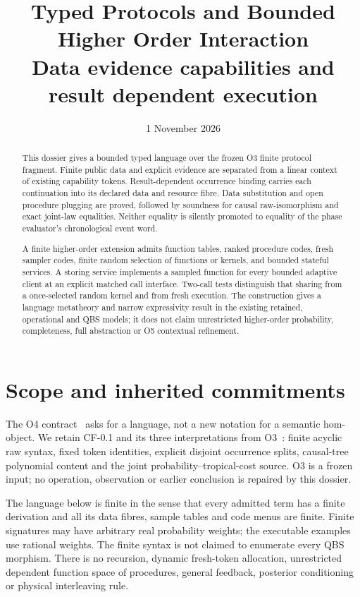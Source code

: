 \documentclass[11pt,a4paper]{article}
\title{Typed Protocols and Bounded Higher Order Interaction\\[5pt]
\large Data evidence capabilities and result dependent execution}
\author{}
\date{1 November 2026}
\theoremstyle{definition}
\begin{document}
\maketitle

\begin{abstract}
This dossier gives a bounded typed language over the frozen O3 finite
protocol fragment. Finite public data and explicit evidence are separated
from a linear context of existing capability tokens. Result-dependent
occurrence binding carries each continuation into its declared data and
resource fibre. Data substitution and open procedure plugging are proved,
followed by soundness for causal raw-isomorphism and exact joint-law
equalities. Neither equality is silently promoted to equality of the
phase evaluator's chronological event word.

A finite higher-order extension admits function tables, ranked procedure
codes, fresh sampler codes, finite random selection of functions or kernels,
and bounded stateful services. A storing service implements a sampled
function for every bounded adaptive client at an explicit matched call
interface. Two-call tests distinguish that sharing from a once-selected
random kernel and from fresh execution. The construction gives a language
metatheory and narrow expressivity result in the existing retained,
operational and QBS models; it does not claim unrestricted higher-order
probability, completeness, full abstraction or O5 contextual refinement.
\end{abstract}

\tableofcontents

\section{Scope and inherited commitments}\label{sec:scope}
The O4 contract~\cite{Contract} asks for a language, not a new notation for
a semantic hom-object. We retain CF-0.1 and its three interpretations from
O3~\cite{O3}: finite acyclic raw syntax, fixed token identities, explicit
disjoint occurrence splits, causal-tree polynomial content and the joint
probability--tropical-cost source. O3 is a frozen input; no operation,
observation or earlier conclusion is repaired by this dossier.

The language below is finite in the sense that every admitted term has a
finite derivation and all its data fibres, sample tables and code menus
are finite. Finite signatures may have arbitrary real probability weights;
the executable examples use rational weights. The finite syntax is not
claimed to enumerate every QBS morphism. There is no recursion, dynamic
fresh-token allocation, unrestricted dependent function space of
procedures, general feedback, posterior conditioning or physical
interleaving rule.
\end{document}
